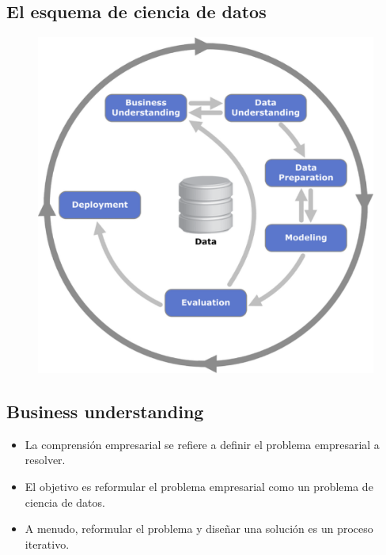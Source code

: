 \documentclass[
  letterpaper,
  DIV=11,
  numbers=noendperiod]{scrartcl}
\begin{document}
\hypertarget{el-esquema-de-ciencia-de-datos}{%
\subsection{El esquema de ciencia de
datos}\label{el-esquema-de-ciencia-de-datos}}

\begin{figure}

{\centering \includegraphics{images/clipboard-4096324521.png}

}

\end{figure}

\hypertarget{business-understanding}{%
\subsection{Business understanding}\label{business-understanding}}

\begin{itemize}
\item
  La comprensión empresarial se refiere a definir el problema
  empresarial a resolver.
\item
  El objetivo es reformular el problema empresarial como un problema de
  ciencia de datos.
\item
  A menudo, reformular el problema y diseñar una solución es un proceso
  iterativo.
\end{itemize}
\end{document}
